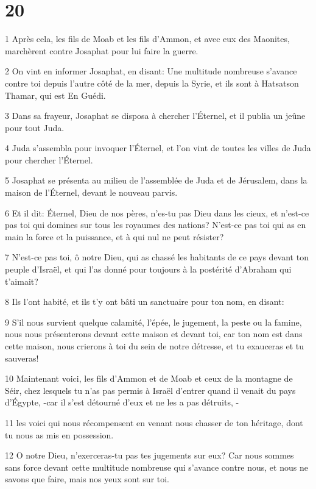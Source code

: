 \chapter{20}

\par 1 Après cela, les fils de Moab et les fils d'Ammon, et avec eux des Maonites, marchèrent contre Josaphat pour lui faire la guerre.
\par 2 On vint en informer Josaphat, en disant: Une multitude nombreuse s'avance contre toi depuis l'autre côté de la mer, depuis la Syrie, et ils sont à Hatsatson Thamar, qui est En Guédi.
\par 3 Dans sa frayeur, Josaphat se disposa à chercher l'Éternel, et il publia un jeûne pour tout Juda.
\par 4 Juda s'assembla pour invoquer l'Éternel, et l'on vint de toutes les villes de Juda pour chercher l'Éternel.
\par 5 Josaphat se présenta au milieu de l'assemblée de Juda et de Jérusalem, dans la maison de l'Éternel, devant le nouveau parvis.
\par 6 Et il dit: Éternel, Dieu de nos pères, n'es-tu pas Dieu dans les cieux, et n'est-ce pas toi qui domines sur tous les royaumes des nations? N'est-ce pas toi qui as en main la force et la puissance, et à qui nul ne peut résister?
\par 7 N'est-ce pas toi, ô notre Dieu, qui as chassé les habitants de ce pays devant ton peuple d'Israël, et qui l'as donné pour toujours à la postérité d'Abraham qui t'aimait?
\par 8 Ils l'ont habité, et ils t'y ont bâti un sanctuaire pour ton nom, en disant:
\par 9 S'il nous survient quelque calamité, l'épée, le jugement, la peste ou la famine, nous nous présenterons devant cette maison et devant toi, car ton nom est dans cette maison, nous crierons à toi du sein de notre détresse, et tu exauceras et tu sauveras!
\par 10 Maintenant voici, les fils d'Ammon et de Moab et ceux de la montagne de Séir, chez lesquels tu n'as pas permis à Israël d'entrer quand il venait du pays d'Égypte, -car il s'est détourné d'eux et ne les a pas détruits, -
\par 11 les voici qui nous récompensent en venant nous chasser de ton héritage, dont tu nous as mis en possession.
\par 12 O notre Dieu, n'exerceras-tu pas tes jugements sur eux? Car nous sommes sans force devant cette multitude nombreuse qui s'avance contre nous, et nous ne savons que faire, mais nos yeux sont sur toi.
